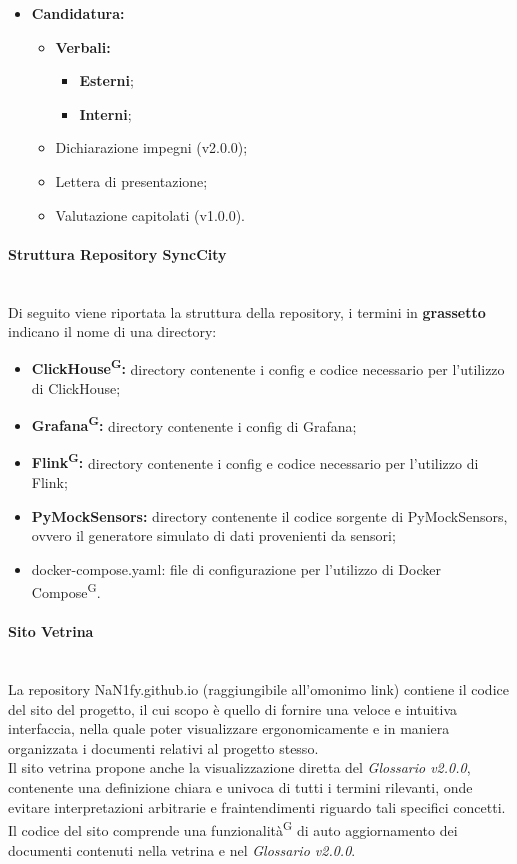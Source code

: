 \documentclass[8pt]{article}
\newcommand{\glossterm}[1]{#1\textsuperscript{G}} %
\newcommand{\subsubsubsection}[1]{\paragraph{#1}\mbox{}\\}
\begin{document}
\begin{itemize}
    \item \textbf{Candidatura:}
    \begin{itemize}
        \item \textbf{Verbali:}
        \begin{itemize}
            \item \textbf{Esterni};
            \item \textbf{Interni};
        \end{itemize}
        \item Dichiarazione impegni (v2.0.0);
        \item Lettera di presentazione;
        \item Valutazione capitolati (v1.0.0).
    \end{itemize}
 \end{itemize}

\subsubsubsection{Struttura Repository SyncCity}
Di seguito viene riportata la struttura della repository, i termini in \textbf{grassetto} indicano il nome di una directory:
\begin{itemize}
    \item \textbf{\glossterm{ClickHouse}:} directory contenente i config e codice necessario per l'utilizzo di ClickHouse;
    \item \textbf{\glossterm{Grafana}:} directory contenente i config di Grafana;
    \item \textbf{\glossterm{Flink}:} directory contenente i config e codice necessario per l'utilizzo di Flink;
    \item \textbf{PyMockSensors:} directory contenente il codice sorgente di PyMockSensors, ovvero il generatore simulato di dati provenienti da sensori;
    \item docker-compose.yaml: file di configurazione per l'utilizzo di \glossterm{Docker Compose}.
\end{itemize}

\subsubsubsection{Sito Vetrina}
La repository NaN1fy.github.io (raggiungibile all'omonimo link) contiene il codice del sito del progetto, il cui scopo è quello di fornire una veloce e intuitiva interfaccia, nella quale poter visualizzare ergonomicamente e in maniera organizzata i documenti relativi al progetto stesso. \\
Il sito vetrina propone anche la visualizzazione diretta del \textit{Glossario v2.0.0}, contenente una definizione chiara e univoca di tutti i termini rilevanti, onde evitare interpretazioni arbitrarie e fraintendimenti riguardo tali specifici concetti. \\
Il codice del sito comprende una \glossterm{funzionalità} di auto aggiornamento dei documenti contenuti nella vetrina e nel \textit{Glossario v2.0.0}.
\end{document}
